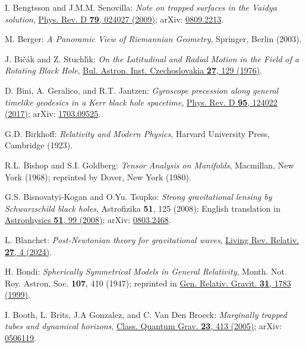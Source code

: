 \begin{thebibliography}{123}
I. Bengtsson and J.M.M. Senovilla:
{\em Note on trapped surfaces in the Vaidya solution},
\href{https://doi.org/10.1103/PhysRevD.79.024027}{Phys. Rev. D {\bf 79}, 024027 (2009)};
arXiv: \href{https://arxiv.org/abs/0809.2213}{0809.2213}.

M. Berger: {\em A Panoramic View of Riemannian Geometry},
Springer, Berlin (2003).

J. Bi\v{c}\'{a}k and Z. Stuchl\'{\i}k:
{\em On the Latitudinal and Radial Motion in the Field of a Rotating Black Hole},
\href{https://ui.adsabs.harvard.edu/abs/1976BAICz..27..129B}{Bul. Astron. Inst. Czechoslovakia {\bf 27}, 129 (1976)}.

D. Bini, A. Geralico, and R.T. Jantzen:
{\em Gyroscope precession along general timelike geodesics in a Kerr black hole spacetime},
\href{https://doi.org/10.1103/PhysRevD.95.124022}{Phys. Rev. D {\bf 95}, 124022 (2017)};
arXiv: \href{https://arxiv.org/abs/1703.09525}{1703.09525}.

G.D. Birkhoff:
{\em Relativity and Modern Physics},
Harvard University Press, Cambridge (1923).

R.L. Bishop and S.I. Goldberg:
{\em Tensor Analysis on Manifolds},
Macmillan, New York (1968); reprinted by Dover, New York (1980).

G.S. Bisnovatyi-Kogan and O.Yu. Tsupko:
{\em Strong gravitational lensing by Schwarzschild black holes},
Astrofizika {\bf 51}, 125 (2008); English translation in
\href{https://doi.org/10.1007/s10511-008-0011-8}{Astrophysics {\bf 51}, 99 (2008)};
arXiv: \href{https://arxiv.org/abs/0803.2468}{0803.2468}.

L. Blanchet:
{\em Post-Newtonian theory for gravitational waves},
\href{https://doi.org/10.1007/s41114-024-00050-z}{Living Rev. Relativ. {\bf 27}, 4 (2024)}.

H. Bondi:
{\em Spherically Symmetrical Models in General Relativity},
Month. Not. Roy. Astron. Soc. {\bf 107}, 410 (1947);
reprinted in
\href{https://doi.org/10.1023/A:1026726520289}{Gen. Relativ. Gravit. {\bf 31}, 1783 (1999)}.

I. Booth, L. Brits, J.A Gonzalez, and C. Van Den Broeck:
{\em Marginally trapped tubes and dynamical horizons},
\href{https://doi.org/10.1088/0264-9381/23/2/009}{Class. Quantum Grav. {\bf 23}, 413 (2005)};
arXiv: \href{https://arxiv.org/abs/gr-qc/0506119}{0506119}.


\end{thebibliography}
